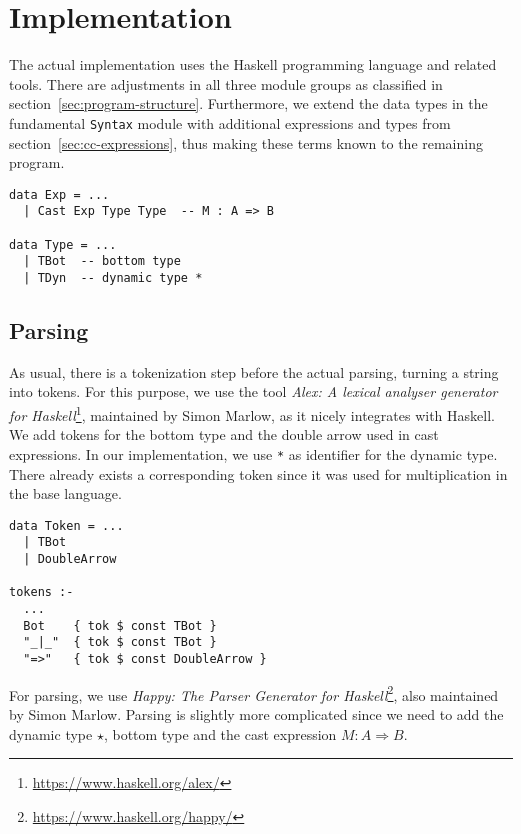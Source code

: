 \chapter{Implementation}\label{chap:implementation}

The actual implementation uses the Haskell programming language and related tools. There are adjustments in all three module groups as classified in section~\ref{sec:program-structure}. Furthermore, we extend the data types in the fundamental \texttt{Syntax} module with additional expressions and types from section~\ref{sec:cc-expressions}, thus making these terms known to the remaining program.

\begin{lstlisting}[caption=Extensions to \texttt{Syntax.hs}]
data Exp = ...
  | Cast Exp Type Type  -- M : A => B

data Type = ...
  | TBot  -- bottom type
  | TDyn  -- dynamic type *
\end{lstlisting}

\section{Parsing}

As usual, there is a tokenization step before the actual parsing, turning a string into tokens. For this purpose, we use the tool \emph{Alex: A lexical analyser generator for Haskell}\footnote{\url{https://www.haskell.org/alex/}}, maintained by Simon Marlow, as it nicely integrates with Haskell. We add tokens for the bottom type and the double arrow used in cast expressions. In our implementation, we use \texttt{*} as identifier for the dynamic type. There already exists a corresponding token since it was used for multiplication in the base language.

\begin{lstlisting}[float,
  caption=Additional tokens (\texttt{Parsing/Tokens.x})]
data Token = ...
  | TBot
  | DoubleArrow

tokens :-
  ...
  Bot    { tok $ const TBot }
  "_|_"  { tok $ const TBot }
  "=>"   { tok $ const DoubleArrow }
\end{lstlisting}

For parsing, we use \emph{Happy: The Parser Generator for Haskell}\footnote{\url{https://www.haskell.org/happy/}}, also maintained by Simon Marlow. Parsing is slightly more complicated since we need to add the dynamic type $\star$, bottom type and the cast expression $M : A \Rightarrow B$.

